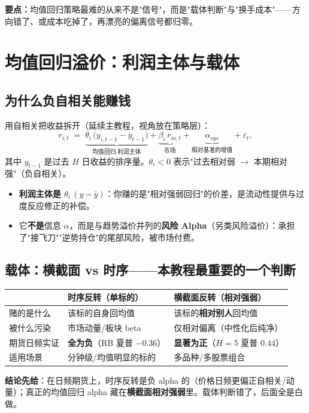 \documentclass[UTF8,11pt]{ctexart}
\newcommand{\takeaway}[1]{\medskip\par\noindent\textbf{要点：}#1\par\medskip}
\begin{document}
\takeaway{均值回归策略最难的从来不是"信号"，而是"载体判断"与"换手成本"——方向错了、或成本吃掉了，再漂亮的偏离信号都归零。}

\section{均值回归溢价：利润主体与载体}
\subsection{为什么负自相关能赚钱}
用自相关把收益拆开（延续主教程，视角放在策略层）：
\begin{equation}
r_{i,t} \;=\; \underbrace{\theta_i\,\big(y_{i,t-1}-\bar y_{t-1}\big)}_{\text{均值回归·利润主体}} + \underbrace{\beta_i\,r_{m,t}}_{\text{市场}} + \underbrace{\alpha_{sys}}_{\text{相对基准的增值}} + \varepsilon_t,
\end{equation}
其中 $y_{t-1}$ 是过去 $H$ 日收益的排序量。$\theta_i<0$ 表示"过去相对弱 $\to$ 本期相对强"（负自相关）。
\begin{itemize}[itemsep=2pt]
\item \textbf{利润主体是 $\theta_i\,(y-\bar y)$}：你赚的是"相对强弱回归"的价差，是流动性提供与过度反应修正的补偿。
\item 它\textbf{不是}信息 $\alpha$，而是与趋势溢价并列的\textbf{风险 Alpha}（另类风险溢价）：承担了"接飞刀""逆势持仓"的尾部风险，被市场付费。
\end{itemize}

\subsection{载体：横截面 vs 时序——本教程最重要的一个判断}
\begin{center}
\renewcommand{\arraystretch}{1.4}
\begin{tabular}{@{}l>{\raggedright\arraybackslash}p{4.2cm}>{\raggedright\arraybackslash}p{4.2cm}@{}}
\toprule
 & \textbf{时序反转（单标的）} & \textbf{横截面反转（相对强弱）} \\
\midrule
赌的是什么 & 该标的自身回均值 & 该标的\textbf{相对别人}回均值 \\
被什么污染 & 市场动量/板块 beta & 仅相对偏离（中性化后纯净） \\
期货日频实证 & \textbf{全为负}（RB 夏普 $-0.36$） & \textbf{显著为正}（$H=5$ 夏普 $0.44$） \\
适用场景 & 分钟级/均值明显的标的 & 多品种/多股票组合 \\
\bottomrule
\end{tabular}
\end{center}
\textbf{结论先给}：在日频期货上，时序反转是负 alpha 的（价格日频更偏正自相关/动量）；真正的均值回归 alpha 藏在\textbf{横截面相对强弱}里。载体判断错了，后面全是白做。
\end{document}
